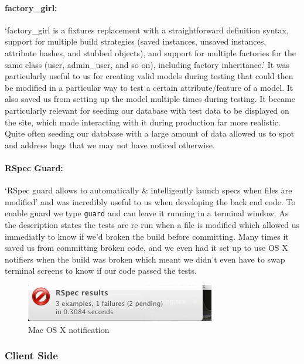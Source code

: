     \paragraph{factory\_girl:}
      `factory\_girl is a fixtures replacement with a straightforward definition syntax, support for multiple build strategies (saved instances, unsaved instances, attribute hashes, and stubbed objects), and support for multiple factories for the same class (user, admin\_user, and so on), including factory inheritance.'\cite{factory-girl} It was particularly useful to us for creating valid models during testing that could then be modified in a particular way to test a certain attribute/feature of a model.
      It also saved us from setting up the model multiple times during testing. It became particularly relevant for seeding our database with test data to be displayed on the site, which made interacting with it during production far more realistic. Quite often seeding our database with a large amount of data allowed us to spot and address bugs that we may not have noticed otherwise.

    \paragraph{RSpec Guard:}
      `RSpec guard allows to automatically \& intelligently launch specs when files are modified'\cite{guard} and was incredibly useful to us when developing the back end code. To enable guard we type \verb!guard! and can leave it running in a terminal window. As the description states the tests are re run when a file is modified which allowed us immediatly to know if we'd broken the build before committing.
      Many times it saved us from committing broken code, and we even had it set up to use OS X notifiers when the build was broken which meant we didn't even have to swap terminal screens to know if our code passed the tests.

      \begin{figure}[H]\centering
      \includegraphics[scale=0.5]{images/project_management/testing/guard_osx}
      \caption{Mac OS X notification}
      \end{figure}

  \subsubsection{Client Side}
